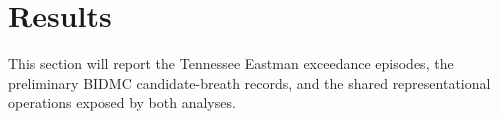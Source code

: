 \section{Results}

This section will report the Tennessee Eastman exceedance episodes, the preliminary BIDMC candidate-breath records, and the shared representational operations exposed by both analyses.
